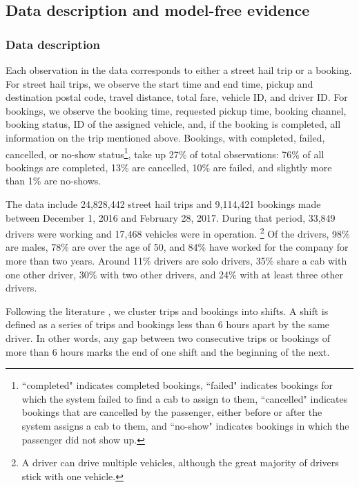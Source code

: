 \documentclass[reviewmode]{restat}
\begin{document}
\subsection{Data description and model-free evidence}

\subsubsection{Data description}
Each observation in the data corresponds to either a street hail trip or a booking. For street hail trips, 
we observe the start time and end time, pickup and destination postal code, 
travel distance, total fare, vehicle ID, and driver ID. For bookings, we observe the booking time, 
requested pickup time, booking channel, booking status,  ID of the assigned vehicle, and, if the booking
is completed, all information on the trip mentioned above. Bookings, with completed, failed, cancelled, 
or no-show status\footnote{``completed" indicates completed bookings, ``failed" indicates bookings for
which the system failed to find a cab to assign to them, ``cancelled" indicates bookings that are cancelled
by the passenger, either before or after the system assigns a cab to them, and ``no-show" indicates bookings 
in which the passenger did not show up.}, take up 27\% of  total observations: 76\% of all bookings are 
completed, 13\% are cancelled, 10\% are failed, and slightly more than 1\% are no-shows.

The data include 24,828,442 street hail trips and 9,114,421 bookings made between December 1, 2016 and
February 28, 2017. During that period, 33,849 drivers were working and 17,468 vehicles were in operation.%
\footnote{A driver can drive multiple vehicles, although the great majority of drivers stick with one vehicle.} 
Of the drivers, 98\% are males, 78\% are over the age of 50, and 84\% have worked for the company for more than
two years. Around 11\% drivers are solo drivers, 35\% share a cab with one other driver, 30\% with two other 
drivers, and 24\% with at least three other drivers.

Following the literature \citep{farber2015you,agarwal2015singaporean,martin2017quit,chen2015dynamic}, we 
cluster trips and bookings into shifts. A shift is defined as a series of trips and bookings less than 6 
hours apart by the same driver. In other words, any gap between two consecutive trips or bookings of more
than 6 hours marks the end of one shift and the beginning of the next. 
\end{document}
